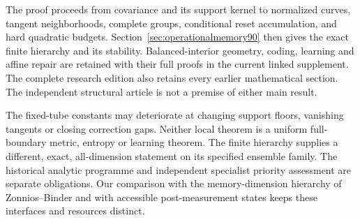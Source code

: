 The proof proceeds from covariance and its support kernel to normalized
curves, tangent neighborhoods, complete groups, conditional reset
accumulation, and hard quadratic budgets.  Section~\ref{sec:operationalmemory90}
then gives the exact finite hierarchy and its stability.  Balanced-interior
geometry, coding, learning and affine repair are retained with their full
proofs in the current linked supplement.  The complete research edition
also retains every earlier mathematical section.  The independent
structural article is not a premise of either main result.

The fixed-tube constants may deteriorate at changing support floors,
vanishing tangents or closing correction gaps.  Neither local theorem
is a uniform full-boundary metric, entropy or learning theorem.  The
finite hierarchy supplies a different, exact, all-dimension statement on
its specified ensemble family.  The historical analytic programme and
independent specialist priority assessment are separate obligations.
Our comparison with the memory-dimension hierarchy of Zonnios--Binder
\cite{ZB90} and with accessible post-measurement states \cite{EQ90}
keeps these interfaces and resources distinct.
